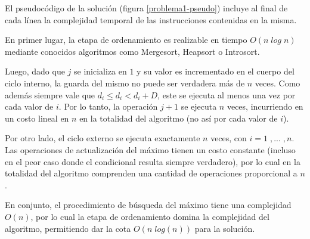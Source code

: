El pseudocódigo de la solución (figura \ref{problema1-pseudo}) incluye al final de cada línea la complejidad temporal de las instrucciones contenidas en la misma.

En primer lugar, la etapa de ordenamiento es realizable en tiempo $O(n\;log\;n)$ mediante conocidos algoritmos como Mergesort, Heapsort o Introsort.

Luego, dado que $j$ se inicializa en $1$ y su valor es incrementado en el cuerpo del ciclo interno, la guarda del mismo no puede ser verdadera más de $n$ veces. Como además siempre vale que $d_i \leq d_i < d_i + D$, este se ejecuta al menos una vez por cada valor de $i$. Por lo tanto, la operación $j + 1$ se ejecuta $n$ veces, incurriendo en un costo lineal en $n$ en la totalidad del algoritmo (no así por cada valor de $i$).

Por otro lado, el ciclo externo se ejecuta exactamente $n$ veces, con $i = 1\;, ...\;, n$. Las operaciones de actualización del máximo tienen un costo constante (incluso en el peor caso donde el condicional resulta siempre verdadero), por lo cual en la totalidad del algoritmo comprenden una cantidad de operaciones proporcional a $n$.

En conjunto, el procedimiento de búsqueda del máximo tiene una complejidad $O(n)$, por lo cual la etapa de ordenamiento domina la complejidad del algoritmo, permitiendo dar la cota $O(n\;log(n))$ para la solución.







